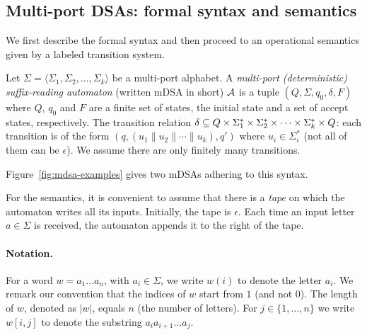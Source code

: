 
\subsection{Multi-port DSAs: formal syntax and semantics} 

We first describe the formal syntax and then proceed to an operational semantics given by a labeled transition system.

\begin{definition} Let
  $\Sigma = \langle \Sigma_1, \Sigma_2, \dots, \Sigma_k \rangle$ be a
  multi-port alphabet. A \emph{multi-port (deterministic)
    suffix-reading automaton} (written mDSA in short) $\mathcal{A}$ is a
  tuple $(Q, \Sigma, q_0, \delta, F)$ where $Q$, $q_0$ and
  $F$ are a finite set of states, the initial state and a set of
  accept states, respectively. %
  The transition relation
  $\delta \subseteq Q \times \Sigma_1^* \times \Sigma_2^* \times \cdots
  \times \Sigma_k^* \times Q$: each transition is of the form
  $(q, (u_1 \parallel u_2 \parallel \cdots \parallel u_k), q')$ where
  $u_i \in \Sigma_i^*$ (not all of them can be $\epsilon$). %
  We assume there are only finitely many transitions. %
 \end{definition}%
Figure~\ref{fig:mdsa-examples} gives two mDSAs adhering to this syntax. %

 For the semantics, it is convenient to assume that there is a \emph{tape} on which the automaton writes all its inputs. Initially, the tape is $\epsilon$. Each time an input letter $a \in \Sigma$ is received, the automaton appends it to the right of the tape. 
 
 \paragraph*{Notation.} For a word $w = a_1 \dots a_{n}$, with $a_i \in \Sigma$, we write $w(i)$ to denote the letter $a_i$. We remark our convention that the indices of $w$ start from $1$ (and not $0$). The length of $w$, denoted as $|w|$, equals $n$ (the number of letters). For $j \in \{1, \dots, n\}$ we write $w[i, j]$ to denote the substring $a_i a_{i+1} \dots a_j$.

